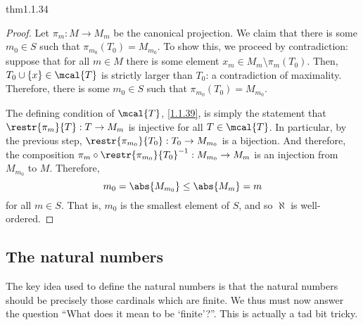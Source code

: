 \begin{thm}{}{thm1.1.34}
\begin{proof}
		Let $\pi _m:M\rightarrow M_m$ be the canonical projection.  We claim that there is some $m_0\in S$ such that $\pi _{m_0}(T_0)=M_{m_0}$.  To show this, we proceed by contradiction:  suppose that for all $m\in M$ there is some element $x_m\in M_m\setminus \pi _m(T_0)$.  Then, $T_0\cup \{ x\}\in \mcal{T}$ is strictly larger than $T_0$:  a contradiction of maximality.  Therefore, there is some $m_0\in S$ such that $\pi _{m_0}(T_0)=M_{m_0}$.
		
		The defining condition of $\mcal{T}$, \eqref{1.1.39}, is simply the statement that $\restr{\pi _m}{T}:T\rightarrow M_m$ is injective for all $T\in \mcal{T}$.  In particular, by the previous step, $\restr{\pi _{m_0}}{T_0}:T_0\rightarrow M_{m_0}$ is a bijection.  And therefore, the composition $\pi _m\circ \restr{\pi _{m_0}}{T_0}^{-1}:M_{m_0}\rightarrow M_m$ is an injection from $M_{m_0}$ to $M$.  Therefore,
		\begin{equation}
		m_0=\abs{M_{m_0}}\leq \abs{M_m}=m
		\end{equation}
		for all $m\in S$.  That is, $m_0$ is the smallest element of $S$, and so $\aleph$ is well-ordered.
	\end{proof}
\end{thm}

\subsection{The natural numbers}

The key idea used to define the natural numbers is that the natural numbers should be precisely those cardinals which are finite.  We thus must now answer the question ``What does it mean to be `finite'?''.  This is actually a tad bit tricky.

